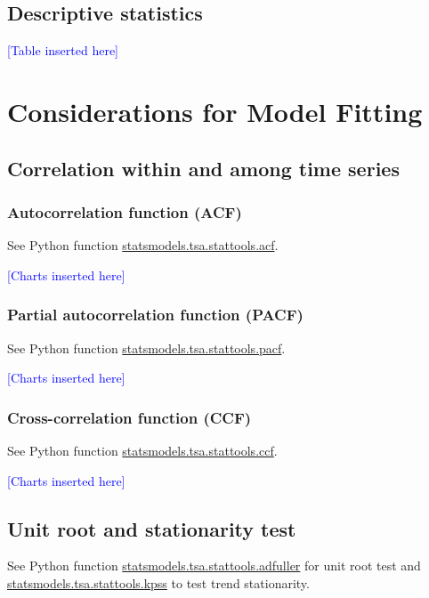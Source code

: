 \documentclass[a4paper]{article}
\begin{document}
\subsection{Descriptive statistics}
\textcolor{blue}{[Table inserted here]}

\section{Considerations for Model Fitting}
\label{sec:implementation}

\subsection{Correlation within and among time series}
\subsubsection*{Autocorrelation function (ACF)}
See Python function \href{https://www.statsmodels.org/devel/generated/statsmodels.tsa.stattools.acf.html}{statsmodels.tsa.stattools.acf}.

\textcolor{blue}{[Charts inserted here]}

\subsubsection*{Partial autocorrelation function (PACF)}
See Python function \href{https://www.statsmodels.org/stable/generated/statsmodels.tsa.stattools.pacf.html}{statsmodels.tsa.stattools.pacf}.

\textcolor{blue}{[Charts inserted here]}

\subsubsection*{Cross-correlation function (CCF)}
See Python function \href{https://www.statsmodels.org/stable/generated/statsmodels.tsa.stattools.ccf.html}{statsmodels.tsa.stattools.ccf}.

\textcolor{blue}{[Charts inserted here]}

\subsection{Unit root and stationarity test}
See Python function \href{https://www.statsmodels.org/dev/generated/statsmodels.tsa.stattools.adfuller.html}{statsmodels.tsa.stattools.adfuller} for unit root test and \href{https://www.statsmodels.org/dev/examples/notebooks/generated/stationarity_detrending_adf_kpss.html} {statsmodels.tsa.stattools.kpss} to test trend stationarity.
\end{document}

